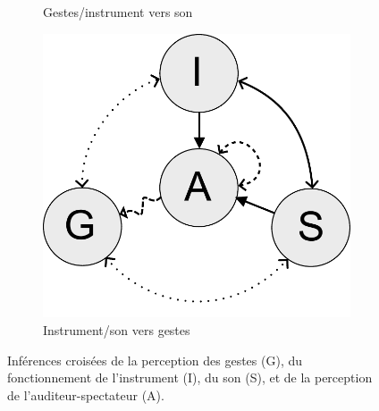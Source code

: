 \begin{figure}[!htbp]
{\begin{subfigure}[b]{.33\textwidth}
			\caption{Gestes/instrument vers son}
		\end{subfigure}%
		\hspace{.02\linewidth}
		\begin{subfigure}[b]{.33\textwidth}
			\centering
			\includegraphics[width=0.9\linewidth]{gfx/03_gesture/gesture-inference-l.pdf}
			\caption{Instrument/son vers gestes}
		\end{subfigure}%
	}
	\caption[Inférences entre gestes, instrument, son et leur perception.]{Inférences croisées de la perception des gestes (G), du fonctionnement de l'instrument (I), du son (S), et de la perception de l'auditeur-spectateur (A).}
	\label{fig:gesture:Inferences}
\end{figure}


